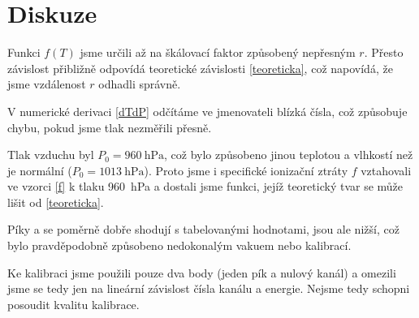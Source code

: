 \section*{Diskuze}


Funkci $f(T)$ jsme určili až na škálovací faktor způsobený nepřesným $r$. Přesto závislost přibližně odpovídá teoretické závislosti \eqref{teoreticka}, což napovídá, že jsme vzdálenost $r$ odhadli správně.

V numerické derivaci \eqref{dTdP} odčítáme ve jmenovateli blízká čísla, což způsobuje chybu, pokud jsme tlak nezměřili přesně.

Tlak vzduchu byl $P_0=\SI{960}{\hecto\pascal}$, což bylo způsobeno jinou teplotou a vlhkostí než je normální ($P_0=\SI{1013}{\hecto\pascal}$). Proto jsme i specifické ionizační ztráty $f$ vztahovali ve vzorci \ref{f} k tlaku \SI{960}{\hecto\pascal} a dostali jsme funkci, jejíž teoretický tvar se může lišit od \eqref{teoreticka}.

Píky \Pudev a \Puosm se poměrně dobře shodují s tabelovanými hodnotami, jsou ale nižší, což bylo pravděpodobně způsobeno nedokonalým vakuem nebo kalibrací.

Ke kalibraci jsme použili pouze dva body (jeden pík a nulový kanál) a omezili jsme se tedy jen na lineární závislost čísla kanálu a energie. Nejsme tedy schopni posoudit kvalitu kalibrace.